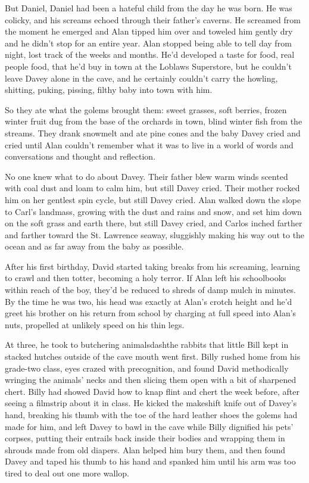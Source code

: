 But Daniel, Daniel had been a hateful child from the day he was born. 
He was colicky, and his screams echoed through their father's caverns. 
He screamed from the moment he emerged and Alan tipped him over and
toweled him gently dry and he didn't stop for an entire year.  Alan
stopped being able to tell day from night, lost track of the weeks and
months.  He'd developed a taste for food, real people food, that he'd
buy in town at the Loblaws Superstore, but he couldn't leave Davey
alone in the cave, and he certainly couldn't carry the howling,
shitting, puking, pissing, filthy baby into town with him.

So they ate what the golems brought them:  sweet grasses, soft
berries, frozen winter fruit dug from the base of the orchards in
town, blind winter fish from the streams.  They drank snowmelt and ate
pine cones and the baby Davey cried and cried until Alan couldn't
remember what it was to live in a world of words and conversations and
thought and reflection.

No one knew what to do about Davey.  Their father blew warm winds
scented with coal dust and loam to calm him, but still Davey cried. 
Their mother rocked him on her gentlest spin cycle, but still Davey
cried.  Alan walked down the slope to Carl's landmass, growing with
the dust and rains and snow, and set him down on the soft grass and
earth there, but still Davey cried, and Carlos inched farther and
farther toward the St.  Lawrence seaway, sluggishly making his way out
to the ocean and as far away from the baby as possible.

After his first birthday, David started taking breaks from his
screaming, learning to crawl and then totter, becoming a holy terror. 
If Alan left his schoolbooks within reach of the boy, they'd be
reduced to shreds of damp mulch in minutes.  By the time he was two,
his head was exactly at Alan's crotch height and he'd greet his
brother on his return from school by charging at full speed into
Alan's nuts, propelled at unlikely speed on his thin legs.

At three, he took to butchering animalsdash{}the rabbits that little Bill
kept in stacked hutches outside of the cave mouth went first.  Billy
rushed home from his grade-two class, eyes crazed with precognition,
and found David methodically wringing the animals' necks and then
slicing them open with a bit of sharpened chert.  Billy had showed
David how to knap flint and chert the week before, after seeing a
filmstrip about it in class.  He kicked the makeshift knife out of
Davey's hand, breaking his thumb with the toe of the hard leather
shoes the golems had made for him, and left Davey to bawl in the cave
while Billy dignified his pets' corpses, putting their entrails back
inside their bodies and wrapping them in shrouds made from old
diapers.  Alan helped him bury them, and then found Davey and taped
his thumb to his hand and spanked him until his arm was too tired to
deal out one more wallop.

